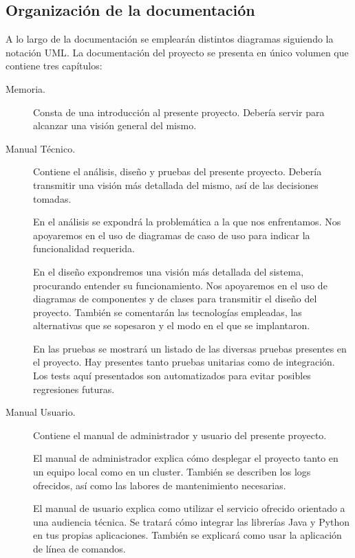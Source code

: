 \subsection{Organización de la documentación}

A lo largo de la documentación se emplearán distintos diagramas
siguiendo la notación UML\cite{UML}. La documentación del proyecto se
presenta en único volumen que contiene tres capítulos:

\begin{description}

    \item[Memoria.] Consta de una introducción al presente
      proyecto. Debería servir para alcanzar una visión general del
      mismo.
    \item[Manual Técnico.] Contiene el análisis, diseño y pruebas del
      presente proyecto. Debería transmitir una visión más detallada
      del mismo, así de las decisiones tomadas.

      En el análisis se expondrá la problemática a la que nos
      enfrentamos. Nos apoyaremos en el uso de diagramas de caso de
      uso para indicar la funcionalidad requerida.

      En el diseño expondremos una visión más detallada del sistema,
      procurando entender su funcionamiento. Nos apoyaremos en el uso
      de diagramas de componentes y de clases para transmitir el
      diseño del proyecto. También se comentarán las tecnologías
      empleadas, las alternativas que se sopesaron y el modo en el que
      se implantaron.

      En las pruebas se mostrará un listado de las diversas pruebas
      presentes en el proyecto. Hay presentes tanto pruebas unitarias
      como de integración. Los tests aquí presentados son
      automatizados para evitar posibles regresiones futuras.

    \item[Manual Usuario.] Contiene el manual de administrador y
      usuario del presente proyecto.

      El manual de administrador explica cómo desplegar el proyecto
      tanto en un equipo local como en un cluster. También se
      describen los logs ofrecidos, así como las labores de
      mantenimiento necesarias.

      El manual de usuario explica como utilizar el servicio ofrecido
      orientado a una audiencia técnica. Se tratará cómo integrar las
      librerías Java y Python en tus propias aplicaciones. También se
      explicará como usar la aplicación de línea de comandos.
\end{description}

